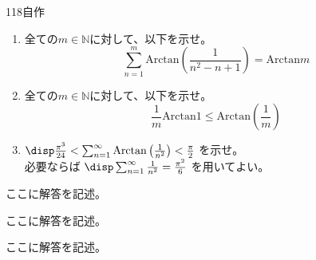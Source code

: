 \begin{thm}{118}{}{自作}
 \begin{enumerate}
  \item 全ての$m\in\mathbb{N}$に対して、以下を示せ。
	\[ \sum_{n=1}^m \mathrm{Arctan} \left(\frac{1}{n^2-n+1}\right) = \mathrm{Arctan} m \]
  \item 全ての$m\in\mathbb{N}$に対して、以下を示せ。
	\[ \frac{1}{m}\mathrm{Arctan}1 \le \mathrm{Arctan}\left(\frac{1}{m}\right) \]
  \item $\disp \frac{\pi^3}{24} < \sum_{n=1}^\infty \mathrm{Arctan}\left(\frac{1}{n^2}\right) < \frac{\pi}{2}$ を示せ。 \\
	必要ならば $\disp \sum_{n=1}^\infty \frac{1}{n^2}=\frac{\pi^2}{6}$ を用いてよい。
 \end{enumerate}
\end{thm}

ここに解答を記述。

ここに解答を記述。

ここに解答を記述。